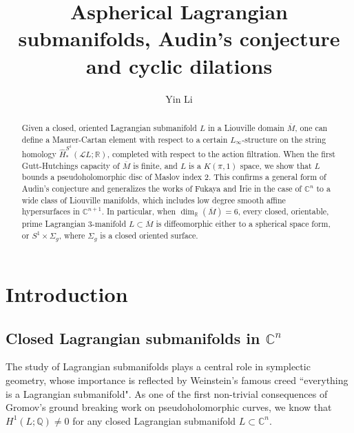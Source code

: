 \documentclass[a4paper]{article}
\numberwithin{equation}{section}
\begin{document}
	
\title{\textbf{Aspherical Lagrangian submanifolds, Audin's conjecture and cyclic dilations}}\author{Yin Li}
\newcommand{\Addresses}{{%
		\bigskip
		\footnotesize
		\textsc{Department of Mathematics, Uppsala University, 753 10 Uppsala, Sweden}\par\nopagebreak
		\textit{E-mail address}: \texttt{yin.li@math.uu.se}
	}}
\date{}\maketitle

\begin{abstract}
Given a closed, oriented Lagrangian submanifold $L$ in a Liouville domain $\overline{M}$, one can define a Maurer-Cartan element with respect to a certain $L_\infty$-structure on the string homology $\widehat{H}_\ast^{S^1}(\mathcal{L}L;\mathbb{R})$, completed with respect to the action filtration. When the first Gutt-Hutchings capacity \cite{gh} of $\overline{M}$ is finite, and $L$ is a $K(\pi,1)$ space, we show that $L$ bounds a pseudoholomorphic disc of Maslov index 2. This confirms a general form of Audin's conjecture \cite{ma} and generalizes the works of Fukaya \cite{kf} and Irie \cite{ki2} in the case of $\mathbb{C}^n$ to a wide class of Liouville manifolds, which includes low degree smooth affine hypersurfaces in $\mathbb{C}^{n+1}$. In particular, when $\dim_\mathbb{R}(\overline{M})=6$,  every closed, orientable, prime Lagrangian 3-manifold $L\subset\overline{M}$ is diffeomorphic either to a spherical space form, or $S^1\times\Sigma_g$, where $\Sigma_g$ is a closed oriented surface.
\end{abstract}

\section{Introduction}

\subsection{Closed Lagrangian submanifolds in $\mathbb{C}^n$}\label{section:Lag}

The study of Lagrangian submanifolds plays a central role in symplectic geometry, whose importance is reflected by Weinstein's famous creed ``everything is a Lagrangian submanifold". As one of the first non-trivial consequences of Gromov's ground breaking work \cite{mg} on pseudoholomorphic curves, we know that $H^1(L;\mathbb{Q})\neq0$ for any closed Lagrangian submanifold $L\subset\mathbb{C}^n$. 
\end{document}
